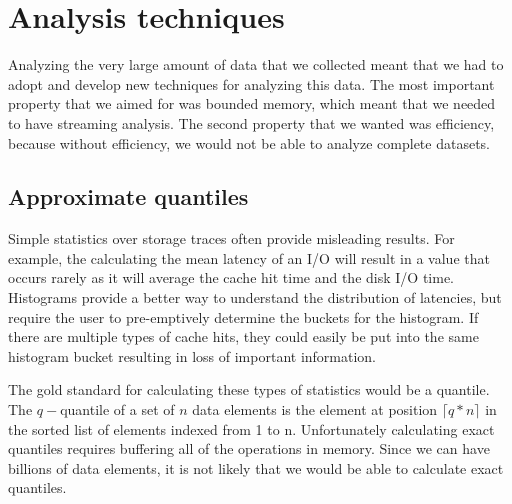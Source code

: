 \section{Analysis techniques}

Analyzing the very large amount of data that we collected meant that
we had to adopt and develop new techniques for analyzing this data.
The most important property that we aimed for was bounded memory,
which meant that we needed to have streaming analysis.  The second
property that we wanted was efficiency, because without efficiency, we
would not be able to analyze complete datasets.

\subsection{Approximate quantiles}

Simple statistics over storage traces often provide misleading
results.  For example, the calculating the mean latency of an I/O will
result in a value that occurs rarely as it will average the cache hit
time and the disk I/O time.  Histograms provide a better way to
understand the distribution of latencies, but require the user to
pre-emptively determine the buckets for the histogram.  If there are
multiple types of cache hits, they could easily be put into the same
histogram bucket resulting in loss of important information.

The gold standard for calculating these types of statistics would be a
quantile.  The $q-$quantile of a set of $n$ data elements is the
element at position $\lceil q*n\rceil$ in the sorted list of elements
indexed from 1 to n.  Unfortunately calculating exact quantiles
requires buffering all of the operations in memory.  Since we can have
billions of data elements, it is not likely that we would be able to
calculate exact quantiles.

